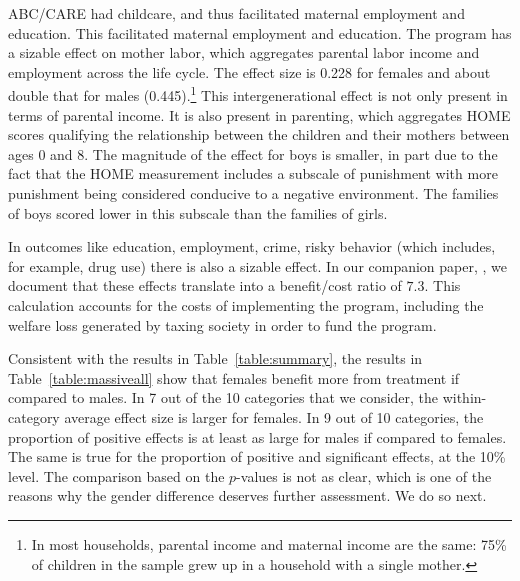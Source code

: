 ABC/CARE had childcare, and thus facilitated maternal employment and education. This facilitated maternal employment and education. The program has a sizable effect on mother labor, which aggregates parental labor income and employment across the life cycle. The effect size is 0.228 for females and about double that for males (0.445).\footnote{In most households, parental income and maternal income are the same: 75\% of children in the sample grew up in a household with a single mother.} This intergenerational effect is not only present in terms of parental income. It is also present in parenting, which aggregates HOME scores qualifying the relationship between the children and their mothers between ages 0 and 8. The magnitude of the effect for boys is smaller, in part due to the fact that the HOME measurement includes a subscale of punishment with more punishment being considered conducive to a negative environment. The families of boys scored lower in this subscale than the families of girls.

In outcomes like education, employment, crime, risky behavior (which includes, for example, drug use) there is also a sizable effect. In our companion paper, \citet{Garcia_Heckman_Leaf_etal_2017_Comp_CBA_Unpublished}, we document that these effects translate into a benefit/cost ratio of $7.3$. This calculation accounts for the costs of implementing the program, including the welfare loss generated by taxing society in order to fund the program. 

Consistent with the results in Table~\ref{table:summary}, the results in Table~\ref{table:massiveall} show that females benefit more from treatment if compared to males. In 7 out of the 10 categories that we consider, the within-category average effect size is larger for females. In 9 out of 10 categories, the proportion of positive effects is at least as large for males if compared to females. The same is true for the proportion of positive and significant effects, at the 10\% level. The comparison based on the \citet{Rosenbaum_2005_Distribution_JRSS} $p$-values is not as clear, which is one of the reasons why the gender difference deserves further assessment. We do so next.


